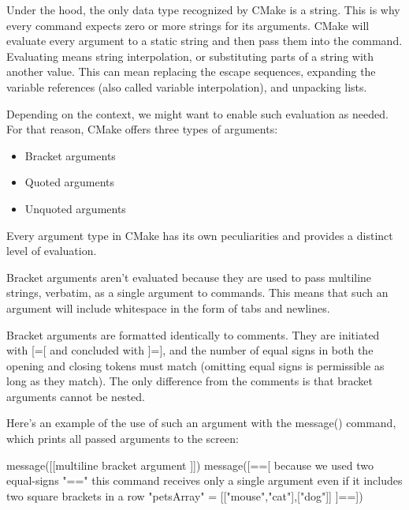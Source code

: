 Under the hood, the only data type recognized by CMake is a string. This is why every command expects zero or more strings for its arguments. CMake will evaluate every argument to a static string and then pass them into the command. Evaluating means string interpolation, or substituting parts of a string with another value. This can mean replacing the escape sequences, expanding the variable references (also called variable interpolation), and unpacking lists.

Depending on the context, we might want to enable such evaluation as needed. For that reason, CMake offers three types of arguments:

\begin{itemize}
\item
Bracket arguments

\item
Quoted arguments

\item
Unquoted arguments
\end{itemize}

Every argument type in CMake has its own peculiarities and provides a distinct level of evaluation.


Bracket arguments aren’t evaluated because they are used to pass multiline strings, verbatim, as a single argument to commands. This means that such an argument will include whitespace in the form of tabs and newlines.

Bracket arguments are formatted identically to comments. They are initiated with [=[ and concluded with ]=], and the number of equal signs in both the opening and closing tokens must match (omitting equal signs is permissible as long as they match). The only difference from the comments is that bracket arguments cannot be nested.

Here’s an example of the use of such an argument with the message() command, which prints all passed arguments to the screen:


\begin{cmake}
message([[multiline
    bracket
    argument
]])
message([==[
    because we used two equal-signs "=="
    this command receives only a single argument
    even if it includes two square brackets in a row
    { "petsArray" = [["mouse","cat"],["dog"]] }
]==])
\end{cmake}


